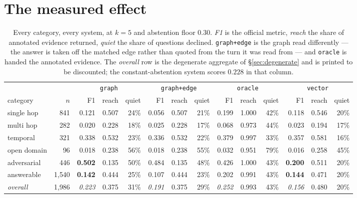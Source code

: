\documentclass[11pt]{article}
\newcommand{\arm}[1]{\texttt{#1}}
\begin{document}
\section{The measured effect}
\label{sec:result}

\begin{table}[t]
\centering
\footnotesize
\setlength{\tabcolsep}{4pt}
\caption{Every category, every system, at $k=5$ and abstention floor $0.30$.
\emph{F1} is the official metric, \emph{reach} the share of annotated evidence
returned, \emph{quiet} the share of questions declined. \arm{graph+edge} is the
graph read differently --- the answer is taken off the matched edge rather than
quoted from the turn it was read from --- and \arm{oracle} is handed the
annotated evidence. The \emph{overall} row is the degenerate aggregate of
\S\ref{sec:degenerate} and is printed to be discounted; the constant-abstention
system scores $0.228$ in that column.}
\label{tab:main}
\begin{tabular}{@{}lr rrr rrr rrr rrr@{}}
\toprule
& & \multicolumn{3}{c}{\arm{graph}} & \multicolumn{3}{c}{\arm{graph+edge}}
  & \multicolumn{3}{c}{\arm{oracle}} & \multicolumn{3}{c}{\arm{vector}} \\
\cmidrule(lr){3-5}\cmidrule(lr){6-8}\cmidrule(lr){9-11}\cmidrule(lr){12-14}
category & $n$ & F1 & reach & quiet & F1 & reach & quiet
                & F1 & reach & quiet & F1 & reach & quiet \\
\midrule
single hop  &  841 & 0.121 & 0.507 & 24\% & 0.056 & 0.507 & 21\% & 0.199 & 1.000 & 42\% & 0.118 & 0.546 & 20\% \\
multi hop   &  282 & 0.020 & 0.228 & 18\% & 0.025 & 0.228 & 17\% & 0.068 & 0.973 & 44\% & 0.023 & 0.194 & 17\% \\
temporal    &  321 & 0.338 & 0.532 & 23\% & 0.336 & 0.532 & 22\% & 0.379 & 0.997 & 33\% & 0.357 & 0.581 & 16\% \\
open domain &   96 & 0.018 & 0.238 & 56\% & 0.018 & 0.238 & 55\% & 0.032 & 0.951 & 79\% & 0.016 & 0.258 & 45\% \\
adversarial &  446 & \textbf{0.502} & 0.135 & 50\% & 0.484 & 0.135 & 48\% & 0.426 & 1.000 & 43\% & \textbf{0.200} & 0.511 & 20\% \\
\midrule
answerable  & 1{,}540 & \textbf{0.142} & 0.444 & 25\% & 0.107 & 0.444 & 23\% & 0.202 & 0.991 & 43\% & \textbf{0.144} & 0.471 & 20\% \\
\textit{overall} & 1{,}986 & \textit{0.223} & 0.375 & 31\% & \textit{0.191} & 0.375 & 29\% & \textit{0.252} & 0.993 & 43\% & \textit{0.156} & 0.480 & 20\% \\
\bottomrule
\end{tabular}
\end{table}
\end{document}
